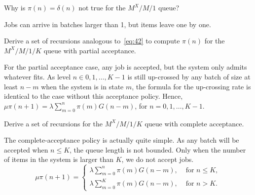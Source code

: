 \begin{exercise}\label{ex:l-154}
 Why is $\pi(n)=\delta(n)$ not true for the $M^X/M/1$  queue?
\begin{solution}
Jobs can arrive in batches larger than 1, but items leave one by one.
\end{solution}
\end{exercise}



\begin{exercise}\label{ex:45}
 Derive a set of recursions analogous to~\cref{eq:42} to compute $\pi(n)$ for the $M^X/M/1/K$ queue with partial acceptance.
\begin{solution}
  For the partial acceptance case, any job is accepted, but the system only admits whatever fits.
  As level $n\in {0,1,\ldots,K-1}$ is still up-crossed by any batch of size at least $n-m$ when the system is in state $m$, the formula for the up-crossing rate is identical to the case without this acceptance policy.
  Hence, $\mu \pi(n+1) = \lambda \sum_{m=0}^n \pi(m) G(n-m)$, for $n=0,1,\ldots, K-1$.
\end{solution}
\end{exercise}

\begin{exercise}\label{ex:9}
 Derive a set of recursions for the $M^X/M/1/K$ queue with complete acceptance.
\begin{solution}
 The complete-acceptance policy is actually quite simple. As any
 batch will be accepted when $n\leq K$, the queue length is not
 bounded. Only when the number of items in the system is larger than
 $K$, we do not accept jobs.
 \begin{equation*}
 \mu \pi(n+1) =
 \begin{cases}
 \lambda \sum_{m=0}^n \pi(m) G(n-m), & \text{ for } n\leq K,\\
 \lambda \sum_{m=0}^K \pi(m) G(n-m), & \text{ for } n> K.
 \end{cases}
 \end{equation*}
\end{solution}
\end{exercise}



